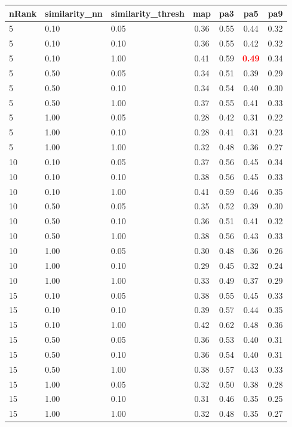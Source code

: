 \begin{tabular}{lllcccc} 
nRank & similarity\_nn & similarity\_thresh & map & pa3 & pa5 & pa9 \\ 
\hline 
 5 & 0.10 & 0.05 & 0.36 & 0.55 & 0.44 & 0.32 \\ 
 5 & 0.10 & 0.10 & 0.36 & 0.55 & 0.42 & 0.32 \\ 
 5 & 0.10 & 1.00 & 0.41 & 0.59 & \textbf{\textcolor{red}{0.49}} & 0.34 \\ 
 5 & 0.50 & 0.05 & 0.34 & 0.51 & 0.39 & 0.29 \\ 
 5 & 0.50 & 0.10 & 0.34 & 0.54 & 0.40 & 0.30 \\ 
 5 & 0.50 & 1.00 & 0.37 & 0.55 & 0.41 & 0.33 \\ 
 5 & 1.00 & 0.05 & 0.28 & 0.42 & 0.31 & 0.22 \\ 
 5 & 1.00 & 0.10 & 0.28 & 0.41 & 0.31 & 0.23 \\ 
 5 & 1.00 & 1.00 & 0.32 & 0.48 & 0.36 & 0.27 \\ 
10 & 0.10 & 0.05 & 0.37 & 0.56 & 0.45 & 0.34 \\ 
10 & 0.10 & 0.10 & 0.38 & 0.56 & 0.45 & 0.33 \\ 
10 & 0.10 & 1.00 & 0.41 & 0.59 & 0.46 & 0.35 \\ 
10 & 0.50 & 0.05 & 0.35 & 0.52 & 0.39 & 0.30 \\ 
10 & 0.50 & 0.10 & 0.36 & 0.51 & 0.41 & 0.32 \\ 
10 & 0.50 & 1.00 & 0.38 & 0.56 & 0.43 & 0.33 \\ 
10 & 1.00 & 0.05 & 0.30 & 0.48 & 0.36 & 0.26 \\ 
10 & 1.00 & 0.10 & 0.29 & 0.45 & 0.32 & 0.24 \\ 
10 & 1.00 & 1.00 & 0.33 & 0.49 & 0.37 & 0.29 \\ 
15 & 0.10 & 0.05 & 0.38 & 0.55 & 0.45 & 0.33 \\ 
15 & 0.10 & 0.10 & 0.39 & 0.57 & 0.44 & 0.35 \\ 
15 & 0.10 & 1.00 & 0.42 & 0.62 & 0.48 & 0.36 \\ 
15 & 0.50 & 0.05 & 0.36 & 0.53 & 0.40 & 0.31 \\ 
15 & 0.50 & 0.10 & 0.36 & 0.54 & 0.40 & 0.31 \\ 
15 & 0.50 & 1.00 & 0.38 & 0.57 & 0.43 & 0.33 \\ 
15 & 1.00 & 0.05 & 0.32 & 0.50 & 0.38 & 0.28 \\ 
15 & 1.00 & 0.10 & 0.31 & 0.46 & 0.35 & 0.25 \\ 
15 & 1.00 & 1.00 & 0.32 & 0.48 & 0.35 & 0.27 \\ 

\end{tabular}
